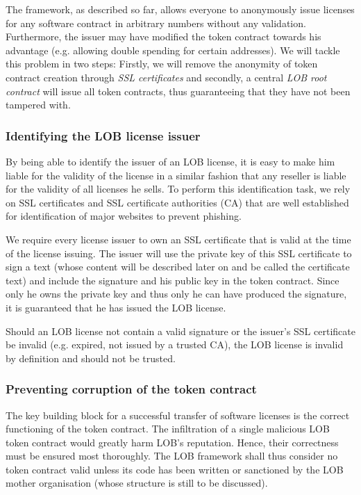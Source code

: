 \documentclass[a4paper]{article}
\begin{document}
The framework, as described so far, allows everyone to anonymously issue licenses for any software contract in arbitrary numbers without any validation. Furthermore, the issuer may have modified the token contract towards his advantage (e.g. allowing double spending for certain addresses). We will tackle this problem in two steps: Firstly, we will remove the anonymity of token contract creation through \emph{SSL certificates} and secondly, a central \emph{LOB root contract} will issue all token contracts, thus guaranteeing that they have not been tampered with.

\subsubsection{Identifying the LOB license issuer}

By being able to identify the issuer of an LOB license, it is easy to make him liable for the validity of the license in a similar fashion that any reseller is liable for the validity of all licenses he sells. To perform this identification task, we rely on SSL certificates and SSL certificate authorities (CA) that are well established for identification of major websites to prevent phishing.

We require every license issuer to own an SSL certificate that is valid at the time of the license issuing. The issuer will use the private key of this SSL certificate to sign a text (whose content will be described later on and be called the certificate text) and include the signature and his public key in the token contract. Since only he owns the private key and thus only he can have produced the signature, it is guaranteed that he has issued the LOB license.

Should an LOB license not contain a valid signature or the issuer's SSL certificate be invalid (e.g. expired, not issued by a trusted CA), the LOB license is invalid by definition and should not be trusted.

\subsubsection{Preventing corruption of the token contract}

The key building block for a successful transfer of software licenses is the correct functioning of the token contract. The infiltration of a single malicious LOB token contract would greatly harm LOB's reputation. Hence, their correctness must be ensured most thoroughly. The LOB framework shall thus consider no token contract valid unless its code has been written or sanctioned by the LOB mother organisation (whose structure is still to be discussed).
\end{document}
